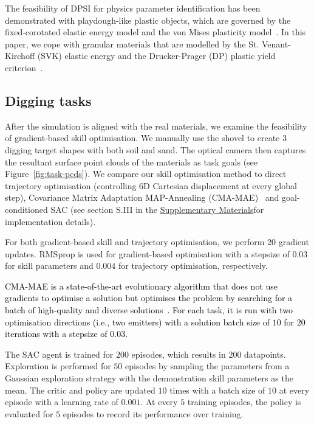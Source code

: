 \documentclass[letterpaper, 10 pt, journal, twoside]{ieeetran}
\newcommand{\rp}[1]{\textcolor{black}{#1}}
\newcommand{\supmat}{\href{https://github.com/IanYangChina/DDBot/blob/main/DDBot_supplementary.pdf}{Supplementary Materials}}
\begin{document}
The feasibility of DPSI for physics parameter identification has been demonstrated with playdough-like plastic objects, which are governed by the fixed-corotated elastic energy model and the von Mises plasticity model~\cite{xy2024sysid}. In this paper, we cope with granular materials that are modelled by the St. Venant-Kirchoff (SVK) elastic energy and the Drucker-Prager (DP) plastic yield criterion~\cite{klar2016drucker}. 

\subsection{Digging tasks} 
After the simulation is aligned with the real materials, we examine the feasibility of gradient-based skill optimisation. We manually use the shovel to create $3$ digging target shapes with both soil and sand. The optical camera then captures the resultant surface point clouds of the materials as task goals (see Figure~\ref{fig:task-pcds}). We compare our skill optimisation method to direct trajectory optimisation (controlling 6D Cartesian displacement at every global step), Covariance Matrix Adaptation MAP-Annealing (CMA-MAE)~\cite{fontaine2023cmamae, tjanaka2023pyribs} and goal-conditioned SAC (see section S.III in the \supmat for implementation details). 

For both gradient-based skill and trajectory optimisation, we perform $20$ gradient updates. RMSprop is used for gradient-based optimisation with a stepsize of $0.03$ for skill parameters and $0.004$ for trajectory optimisation, respectively. 

\rp{CMA-MAE is a state-of-the-art evolutionary algorithm that does not use gradients to optimise a solution but optimises the problem by searching for a batch of high-quality and diverse solutions~\cite{fontaine2023cmamae, tjanaka2023pyribs}. For each task, it is run with two optimisation directions (i.e., two emitters) with a solution batch size of $10$ for $20$ iterations with a stepsize of $0.03$.}

The SAC agent is trained for $200$ episodes, which results in $200$ datapoints. Exploration is performed for $50$ episodes by sampling the parameters from a Gaussian exploration strategy with the demonstration skill parameters as the mean. The critic and policy are updated $10$ times with a batch size of $10$ at every episode with a learning rate of $0.001$. At every $5$ training episodes, the policy is evaluated for $5$ episodes to record its performance over training. 
\end{document}
